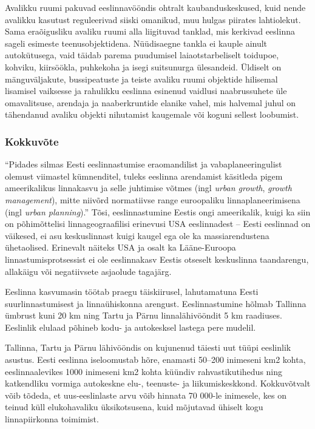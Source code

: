 \documentclass[estonian,]{article}
\begin{document}
Avalikku ruumi pakuvad eeslinnavööndis ohtralt kaubanduskeskused, kuid nende avalikku kasutust reguleerivad siiski omanikud, muu hulgas piirates lahtiolekut. Sama eraõigusliku avaliku ruumi alla liigituvad tanklad, mis kerkivad eeslinna sageli esimeste teenusobjektidena. Nüüdisaegne tankla ei kauple ainult autokütusega, vaid täidab parema puudumisel laiaotstarbeliselt toidupoe, kohviku, kiirsöökla, puhkekoha ja isegi suitsunurga ülesandeid. Üldiselt on mänguväljakute, bussipeatuste ja teiste avaliku ruumi objektide hilisemal lisamisel vaiksesse ja rahulikku eeslinna esinenud vaidlusi naabrussuhete üle omavalitsuse, arendaja ja naaberkruntide elanike vahel, mis halvemal juhul on tähendanud avaliku objekti nihutamist kaugemale või koguni sellest loobumist.

\hypertarget{kokkuvuxf5te-2}{%
\subsubsection*{Kokkuvõte}\label{kokkuvuxf5te-2}}

``Pidades silmas Eesti eeslinnastumise eraomandilist ja vabaplaneeringulist olemust viimastel kümnenditel, tuleks eeslinna arendamist käsitleda pigem ameerikalikus linnakasvu ja selle juhtimise võtmes (ingl \emph{urban growth}, \emph{growth management}), mitte niivõrd normatiivse range euroopaliku linnaplaneerimisena (ingl \emph{urban planning}).'' Tõsi, eeslinnastumine Eestis ongi ameerikalik, kuigi ka siin on põhimõttelisi linnageograafilisi erinevusi USA eeslinnadest -- Eesti eeslinnad on väikesed, ei asu keskuslinnast kuigi kaugel ega ole ka massiarendustena ühetaolised. Erinevalt näiteks USA ja osalt ka Lääne-Euroopa linnastumisprotsessist ei ole eeslinnakasv Eestis otseselt keskuslinna taandarengu, allakäigu või negatiivsete asjaolude tagajärg.

Eeslinna kasvumasin töötab praegu täiskiirusel, lahutamatuna Eesti suurlinnastumisest ja linnaühiskonna arengust. Eeslinnastumine hõlmab Tallinna ümbrust kuni 20 km ning Tartu ja Pärnu linnalähivööndit 5 km raadiuses. Eeslinlik elulaad põhineb kodu- ja autokesksel lastega pere mudelil.

Tallinna, Tartu ja Pärnu lähivööndis on kujunenud täiesti uut tüüpi eeslinlik asustus. Eesti eeslinna iseloomustab hõre, enamasti 50--200 inimeseni km2 kohta, eeslinnaalevikes 1000 inimeseni km2 kohta küündiv rahvastikutihedus ning katkendliku vormiga autokeskne elu-, teenuste- ja liikumiskeskkond. Kokkuvõtvalt võib tõdeda, et uus-eeslinlaste arvu võib hinnata 70 000-le inimesele, kes on teinud küll elukohavaliku üksikotsusena, kuid mõjutavad ühiselt kogu linnapiirkonna toimimist.
\end{document}

